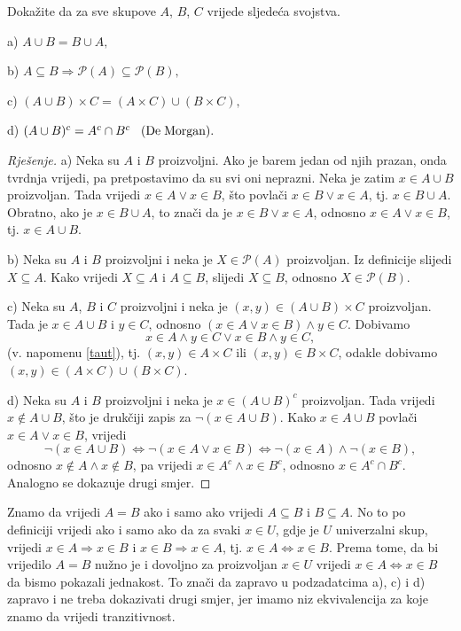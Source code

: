 \begin{exercise}
Dokažite da za sve skupove $A$, $B$, $C$ vrijede sljedeća svojstva.
\begin{AutoMultiColItemize}
\item[a)] $A\cup B=B\cup A,$
\item[b)] $A\subseteq B\Rightarrow \mathcal{P}(A)\subseteq \mathcal{P}(B),$
\item[c)] $(A\cup B)\times C=(A\times C)\cup (B\times C),$
\item[d)] $(A\cup B)^c=A^c\cap B^c \hspace{0.3cm} \mathrm{(De} \hspace{0.1cm}\mathrm{Morgan)}.$
\end{AutoMultiColItemize}
\begin{proof}[Rješenje]
a) Neka su $A$ i $B$ proizvoljni. Ako je barem jedan od njih prazan, onda tvrdnja vrijedi, pa pretpostavimo da su svi oni neprazni. Neka je zatim $x\in A\cup B$ proizvoljan. Tada vrijedi $x\in A\vee x\in B$, što povlači $x\in B\vee x\in A$, tj. $x\in B\cup A$. Obratno, ako je $x\in B\cup A$, to znači da je $x\in B\vee x\in A$, odnosno $x\in A\vee x\in B$, tj. $x\in A\cup B$.

b) Neka su $A$ i $B$ proizvoljni i neka je $X\in \mathcal{P}(A)$ proizvoljan. Iz definicije slijedi $X\subseteq A$. Kako vrijedi $X\subseteq A$ i $A\subseteq B$, slijedi $X\subseteq B$, odnosno $X\in \mathcal{P}(B)$.

c) Neka su $A$, $B$ i $C$ proizvoljni i neka je $(x, y)\in (A\cup B)\times C$ proizvoljan. Tada je $x\in A\cup B$ i $y\in C$, odnosno $(x\in A\vee x\in B)\wedge y\in C$. Dobivamo $$x\in A\wedge y\in C\vee x\in B\wedge y\in C,$$
(v. napomenu \ref{taut}), tj. $(x, y)\in A\times C$ ili $(x, y)\in B\times C$, odakle dobivamo $(x, y)\in (A\times C)\cup (B\times C)$.

d) Neka su $A$ i $B$ proizvoljni i neka je $x\in (A\cup B)^c$ proizvoljan. Tada vrijedi $x\notin A\cup B$, što je drukčiji zapis za $\neg(x\in A\cup B)$. Kako $x\in A\cup B$ povlači $x\in A \vee x\in B$, vrijedi $$\neg(x\in A\cup B)\Leftrightarrow\neg(x\in A \vee x\in B)\Leftrightarrow\neg (x\in A)\wedge \neg (x\in B),$$ odnosno $x\notin A \wedge x\notin B$, pa vrijedi $x\in A^c\wedge x\in B^c$, odnosno $x\in A^c\cap B^c$. Analogno se dokazuje drugi smjer.
\end{proof}
\end{exercise}
\begin{remark}
\label{firstrem}
Znamo da vrijedi $A=B$ ako i samo ako vrijedi $A\subseteq B$ i $B\subseteq A$. No to po definiciji vrijedi ako i samo ako da za svaki $x\in U$, gdje je $U$ univerzalni skup, vrijedi $x\in A\Rightarrow x\in B$ i $x\in B\Rightarrow x\in A$, tj. $x\in A\Leftrightarrow x\in B$. Prema tome, da bi vrijedilo $A=B$ nužno je i dovoljno za proizvoljan $x\in U$ vrijedi $x\in A\Leftrightarrow x\in B$ da bismo pokazali jednakost. To znači da zapravo u podzadatcima a), c) i d) zapravo i ne treba dokazivati drugi smjer, jer imamo niz ekvivalencija za koje znamo da vrijedi tranzitivnost.
\end{remark}

